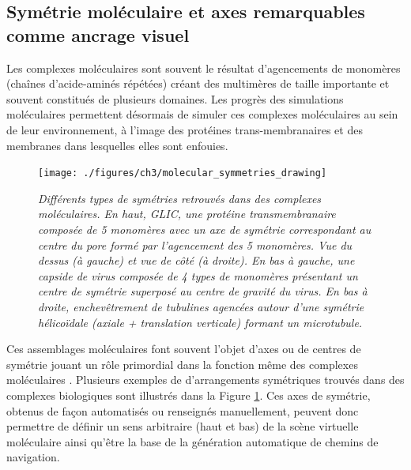 \subsection{Symétrie moléculaire et axes remarquables comme ancrage visuel}


Les complexes moléculaires sont souvent le résultat d'agencements de monomères (chaînes d'acide-aminés répétées) créant des multimères de taille importante et souvent constitués de plusieurs domaines. Les progrès des simulations moléculaires permettent désormais de simuler ces complexes moléculaires au sein de leur environnement, à l'image des protéines trans-membranaires et des membranes dans lesquelles elles sont enfouies. %

\begin{figure}[h]
  \centering
  {\texttt{[image: ./figures/ch3/molecular\_symmetries\_drawing]}}
    \caption[Types de symétries retrouvées dans l'agencement de complexes protéiques majeurs.]{{\it Différents types de symétries retrouvés dans des complexes moléculaires. En haut, GLIC, une protéine transmembranaire composée de 5 monomères avec un axe de symétrie correspondant au centre du pore formé par l'agencement des 5 monomères. Vue du dessus (à gauche) et vue de côté (à droite). En bas à gauche, une capside de virus composée de 4 types de monomères présentant un centre de symétrie superposé au centre de gravité du virus. En bas à droite, enchevêtrement de tubulines agencées autour d'une symétrie hélicoïdale (axiale + translation verticale) formant un microtubule.}}
  \label{Fig:molecular_symmetries_drawing}
  \hspace{0.2cm}
\end{figure}

Ces assemblages moléculaires  font souvent l'objet d'axes ou de centres de symétrie jouant un rôle primordial dans la fonction même des complexes moléculaires \cite{goodsell_structural_2000}. Plusieurs exemples de d'arrangements symétriques trouvés dans des complexes biologiques sont illustrés dans la Figure \ref{Fig:molecular_symmetries_drawing}. Ces axes de symétrie, obtenus de façon automatisés ou renseignés manuellement, peuvent donc permettre de définir un sens arbitraire (haut et bas) de la scène virtuelle moléculaire ainsi qu'être la base de la génération automatique de chemins de navigation. 

